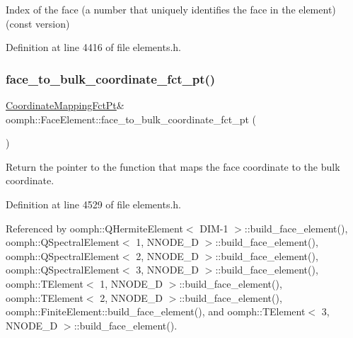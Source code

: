 Index of the face (a number that uniquely identifies the face in the element) (const version) 



Definition at line 4416 of file elements.\+h.

\mbox{\label{classoomph_1_1FaceElement_a284064de90f834ec3a877d49bdee759a}} 
\subsubsection{\texorpdfstring{face\+\_\+to\+\_\+bulk\+\_\+coordinate\+\_\+fct\+\_\+pt()}{face\_to\_bulk\_coordinate\_fct\_pt()}\hspace{0.1cm}{\footnotesize\ttfamily [1/2]}}
{\footnotesize\ttfamily \hyperlink{classoomph_1_1FaceElement_aaa3af8b5d2e9584bdcd9b133990d7591}{Coordinate\+Mapping\+Fct\+Pt}\& oomph\+::\+Face\+Element\+::face\+\_\+to\+\_\+bulk\+\_\+coordinate\+\_\+fct\+\_\+pt (\begin{DoxyParamCaption}{ }\end{DoxyParamCaption})\hspace{0.3cm}{\ttfamily [inline]}}



Return the pointer to the function that maps the face coordinate to the bulk coordinate. 



Definition at line 4529 of file elements.\+h.



Referenced by oomph\+::\+Q\+Hermite\+Element$<$ D\+I\+M-\/1 $>$\+::build\+\_\+face\+\_\+element(), oomph\+::\+Q\+Spectral\+Element$<$ 1, N\+N\+O\+D\+E\+\_\+D $>$\+::build\+\_\+face\+\_\+element(), oomph\+::\+Q\+Spectral\+Element$<$ 2, N\+N\+O\+D\+E\+\_\+D $>$\+::build\+\_\+face\+\_\+element(), oomph\+::\+Q\+Spectral\+Element$<$ 3, N\+N\+O\+D\+E\+\_\+D $>$\+::build\+\_\+face\+\_\+element(), oomph\+::\+T\+Element$<$ 1, N\+N\+O\+D\+E\+\_\+D $>$\+::build\+\_\+face\+\_\+element(), oomph\+::\+T\+Element$<$ 2, N\+N\+O\+D\+E\+\_\+D $>$\+::build\+\_\+face\+\_\+element(), oomph\+::\+Finite\+Element\+::build\+\_\+face\+\_\+element(), and oomph\+::\+T\+Element$<$ 3, N\+N\+O\+D\+E\+\_\+D $>$\+::build\+\_\+face\+\_\+element().

